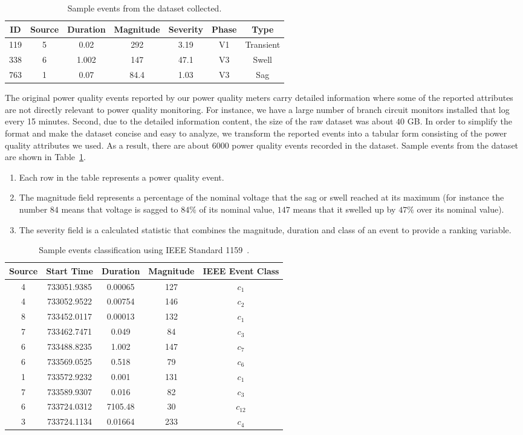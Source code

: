 \begin{table}[!t]
\caption{Sample events from the dataset collected.}
\centering 
\renewcommand{\tabcolsep}{0.15cm}
\begin{tabular}{|c|c|c|c|c|c|c|}
\hline ID & Source & Duration & Magnitude & Severity & Phase  & Type\tabularnewline
\hline 119 & 5 & 0.02 & 292	& 3.19 & V1 & Transient\tabularnewline
 338 & 6 & 1.002 & 147 & 47.1 & V3 & Swell\tabularnewline
 763 & 1 & 0.07 & 84.4 & 1.03 & V3 & Sag\tabularnewline
\hline 
\end{tabular}
\label{tbl:sampleData}
\end{table}
The original power quality events reported by our power quality meters carry detailed information where some of the reported attributes are not directly relevant to power quality monitoring. For instance, we have a large number of branch circuit monitors installed that log every 15 minutes. Second, due to the detailed information content, the size of the raw dataset was about $40$ GB. In order to simplify the format and make the dataset concise and easy to analyze, we transform the reported events into a tabular form consisting of the power quality attributes we used. As a result, there are about $6000$ power quality events recorded in the dataset. Sample events from the dataset are shown in Table~\ref{tbl:sampleData}.

\begin{enumerate}
\item Each row in the table represents a power quality event.
\item The magnitude field represents a percentage of the nominal voltage that the sag or swell reached at its maximum (for instance the number $84$ means that voltage is sagged to $84\%$ of its nominal value, $147$ means that it swelled up by $47\%$ over its nominal value).
\item The severity field is a calculated statistic that combines the magnitude, duration and class of an event to provide a ranking variable.
\end{enumerate}

\begin{table}[!t]
\caption{Sample events classification using IEEE Standard 1159~\cite{IEEE09_1159}.}
\centering 
\begin{tabular}{|c|c|c|c|c|}
\hline Source & Start Time & Duration & Magnitude & IEEE Event Class\tabularnewline
\hline 4 & 733051.9385 & 0.00065 & 127 & $c_1$\tabularnewline
 4 & 733052.9522 & 0.00754 & 146 & $c_2$\tabularnewline
 8 & 733452.0117 & 0.00013 & 132 & $c_1$\tabularnewline
 7 & 733462.7471 & 0.049 & 84 & $c_3$\tabularnewline
 6 & 733488.8235 & 1.002 & 147 & $c_7$\tabularnewline
 6 & 733569.0525 & 0.518 & 79 & $c_6$\tabularnewline
 1 & 733572.9232 & 0.001 & 131 & $c_1$\tabularnewline
 7 & 733589.9307 & 0.016 & 82 & $c_3$\tabularnewline
 6 & 733724.0312 & 7105.48 & 30 & $c_{12}$\tabularnewline
 3 & 733724.1134 & 0.01664 & 233 & $c_4$\tabularnewline
\hline 
\end{tabular}
\label{tbl:sampleClassData}
\end{table}

